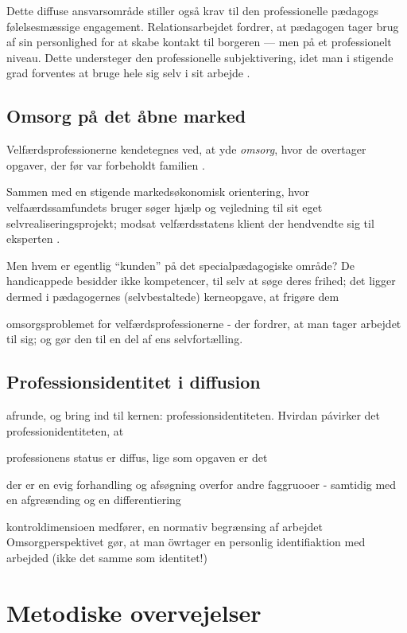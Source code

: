 Dette diffuse ansvarsområde stiller også krav til den professionelle pædagogs følelsesmæssige engagement. Relationsarbejdet fordrer, at pædagogen tager brug af sin personlighed for at skabe kontakt til borgeren — men på et professionelt niveau. Dette understeger den professionelle subjektivering, idet man i stigende grad forventes at bruge hele sig selv i sit arbejde \autocite[s. 71f]{mik-meyerIndledningSkabeProfessionel2012}.

\subsection{Omsorg på det åbne marked}

Velfærdsprofessionerne kendetegnes ved, at yde \textit{omsorg}, hvor de overtager opgaver, der før var forbeholdt familien \autocite{frederiksenVelfaerdsprofessionerMellemOmsorg2017}. 

Sammen med en stigende markedsøkonomisk orientering, hvor velfaærdssamfundets bruger søger hjælp og vejledning til sit eget selvrealiseringsprojekt; modsat velfærdsstatens klient der hendvendte sig til eksperten \autocite{hansbolKonstruktionAfProfessionel2008}.

Men hvem er egentlig “kunden” på det specialpædagogiske område?
De handicappede besidder ikke kompetencer, til selv at søge deres frihed; det ligger dermed i pædagogernes (selvbestaltede) kerneopgave, at frigøre dem \autocite{socialpaedagogerneSocialpaedagogiskeKernefaglighed2015}

omsorgsproblemet for velfærdsprofessionerne - der fordrer, at man tager arbejdet til sig; og gør den til en del af ens selvfortælling.

\subsection{Professionsidentitet i diffusion}
afrunde, og bring ind til kernen: professionsidentiteten.
Hvirdan pávirker det professionidentiteten, at 

professionens status er diffus, lige som opgaven er det

der er en evig forhandling og afsøgning overfor andre faggruooer - samtidig med en afgreænding og en differentiering

kontroldimensioen medfører, en normativ begrænsing af arbejdet
Omsorgperspektivet gør, at man öwrtager en personlig identifiaktion med arbejded (ikke det samme som identitet!)


\section{Metodiske overvejelser}

